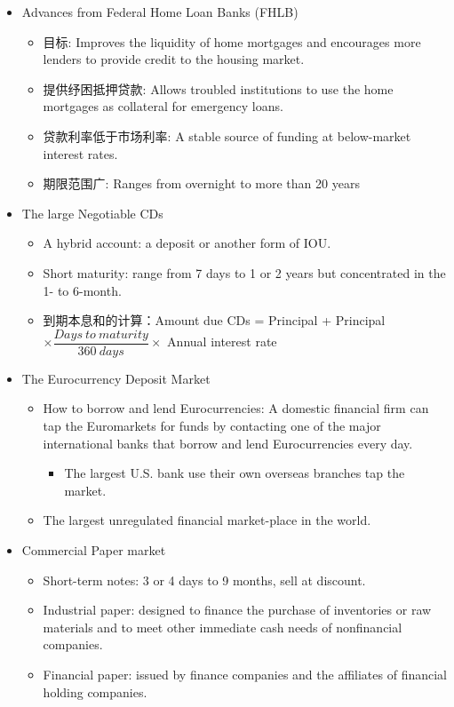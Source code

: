 \begin{itemize}
\item Advances from Federal Home Loan Banks (FHLB)
    \begin{itemize}
    \item 目标: Improves the liquidity of home mortgages and encourages more lenders to provide credit to the housing market.
    \item 提供纾困抵押贷款: Allows troubled institutions to use the home mortgages as collateral for emergency loans.
    \item 贷款利率低于市场利率: A stable source of funding at below-market interest rates.
    \item 期限范围广: Ranges from overnight to more than 20 years
    \end{itemize}
    
\item The large Negotiable CDs
    \begin{itemize}
    \item A hybrid account: a deposit or another form of IOU.
    \item  Short maturity: range from 7 days to 1 or 2 years but concentrated in the 1- to 6-month.
    \item 到期本息和的计算：Amount due CDs = Principal + Principal $\times\dfrac{Days\ to\ maturity}{360\ days}\times$ Annual interest rate
    \end{itemize}
    
\item The Eurocurrency Deposit Market
    \begin{itemize}
    \item How to borrow and lend Eurocurrencies: A domestic financial firm can tap the Euromarkets for funds by contacting one of the major international banks that borrow and lend Eurocurrencies every day.
        \begin{itemize}
        \item The largest U.S. bank use their own overseas branches tap the market.
        \end{itemize}
    \item The largest unregulated financial market-place in the world.
    \end{itemize}
    
\item Commercial Paper market
    \begin{itemize}
    \item Short-term notes: 3 or 4 days to 9 months, sell at discount.
    \item Industrial paper: designed to finance the purchase of inventories or raw materials and to meet other immediate cash needs of nonfinancial companies.
    \item Financial paper: issued by finance companies and the affiliates of financial holding companies.


\end{itemize}
\end{itemize}
